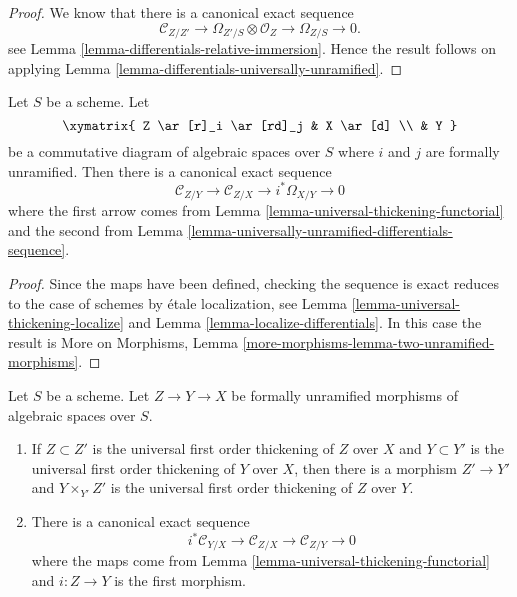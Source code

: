 \begin{proof}
We know that there is a canonical exact sequence
$$
\mathcal{C}_{Z/Z'} \to
\Omega_{Z'/S} \otimes \mathcal{O}_Z \to
\Omega_{Z/S} \to 0.
$$
see
Lemma \ref{lemma-differentials-relative-immersion}.
Hence the result follows on applying
Lemma \ref{lemma-differentials-universally-unramified}.
\end{proof}

\begin{lemma}
\label{lemma-two-unramified-morphisms}
Let $S$ be a scheme. Let
$$
\xymatrix{
Z \ar[r]_i \ar[rd]_j & X \ar[d] \\
& Y
}
$$
be a commutative diagram of algebraic spaces over $S$
where $i$ and $j$ are formally unramified. Then there is a
canonical exact sequence
$$
\mathcal{C}_{Z/Y} \to
\mathcal{C}_{Z/X} \to
i^*\Omega_{X/Y} \to 0
$$
where the first arrow comes from
Lemma \ref{lemma-universal-thickening-functorial}
and the second from
Lemma \ref{lemma-universally-unramified-differentials-sequence}.
\end{lemma}

\begin{proof}
Since the maps have been defined, checking the sequence is exact
reduces to the case of schemes by \'etale localization, see
Lemma \ref{lemma-universal-thickening-localize}
and
Lemma \ref{lemma-localize-differentials}.
In this case the result is
More on Morphisms,
Lemma \ref{more-morphisms-lemma-two-unramified-morphisms}.
\end{proof}

\begin{lemma}
\label{lemma-transitivity-conormal-unramified}
Let $S$ be a scheme.
Let $Z \to Y \to X$ be formally unramified morphisms of
algebraic spaces over $S$.
\begin{enumerate}
\item If $Z \subset Z'$ is the universal first order thickening of $Z$
over $X$ and $Y \subset Y'$ is the universal first order thickening of $Y$
over $X$, then there is a morphism $Z' \to Y'$ and $Y \times_{Y'} Z'$ is
the universal first order thickening of $Z$ over $Y$.
\item There is a canonical exact sequence
$$
i^*\mathcal{C}_{Y/X} \to
\mathcal{C}_{Z/X} \to
\mathcal{C}_{Z/Y} \to 0
$$
where the maps come from
Lemma \ref{lemma-universal-thickening-functorial}
and $i : Z \to Y$ is the first morphism.
\end{enumerate}
\end{lemma}

